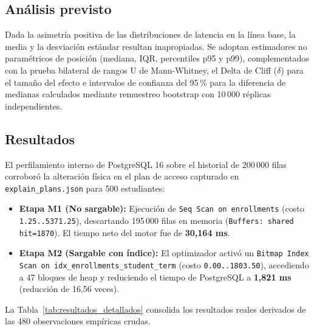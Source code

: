 \documentclass[conference]{IEEEtran}
\begin{document}
\subsection{Análisis previsto}
Dada la asimetría positiva de las distribuciones de latencia en la línea base, la media y la desviación estándar resultan inapropiadas. Se adoptan estimadores no paramétricos de posición (mediana, IQR, percentiles p95 y p99), complementados con la prueba bilateral de rangos U de Mann-Whitney, el Delta de Cliff ($\delta$) para el tamaño del efecto e intervalos de confianza del 95\,\% para la diferencia de medianas calculados mediante remuestreo bootstrap con 10\,000 réplicas independientes.

\subsection{Resultados}
El perfilamiento interno de PostgreSQL 16 sobre el historial de 200\,000 filas corroboró la alteración física en el plan de acceso capturado en \texttt{explain\_plans.json} para 500 estudiantes:
\begin{itemize}
    \setlength{\itemsep}{1pt}
    \setlength{\parskip}{0pt}
    \item \textbf{Etapa M1 (No sargable):} Ejecución de \texttt{Seq Scan on enrollments} (costo \texttt{1.25..5371.25}), descartando 195\,000 filas en memoria (\texttt{Buffers: shared hit=1870}). El tiempo neto del motor fue de \textbf{30,164 ms}.
    \item \textbf{Etapa M2 (Sargable con índice):} El optimizador activó un \texttt{Bitmap Index Scan on idx\_enrollments\_student\_term} (costo \texttt{0.00..1803.50}), accediendo a 47 bloques de heap y reduciendo el tiempo de PostgreSQL a \textbf{1,821 ms} (reducción de 16,56 veces).
\end{itemize}

La Tabla~\ref{tab:resultados_detallados} consolida los resultados reales derivados de las 480 observaciones empíricas crudas.
\end{document}
